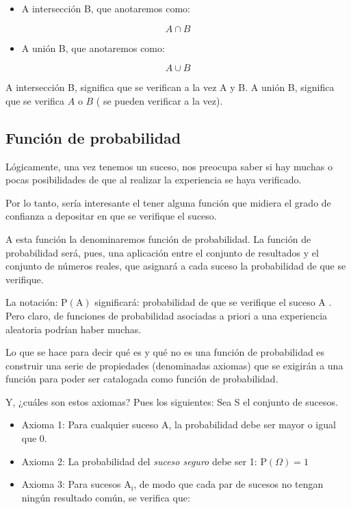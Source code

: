 \documentclass[
]{article}
\providecommand{\tightlist}{%
  \setlength{\itemsep}{0pt}\setlength{\parskip}{0pt}}
\begin{document}
\begin{itemize}
\tightlist
\item
  A intersección B, que anotaremos como:
\end{itemize}

\[
A \cap B
\]

\begin{itemize}
\tightlist
\item
  A unión B, que anotaremos como:
\end{itemize}

\[
A \cup B
\]

A intersección B, significa que se verifican a la vez A y B. A unión B,
significa que se verifica \(A\) o \(B\) ( se pueden verificar a la vez).

\subsection{Función de probabilidad}\label{funciuxf3n-de-probabilidad}

Lógicamente, una vez tenemos un suceso, nos preocupa saber si hay muchas
o pocas posibilidades de que al realizar la experiencia se haya
verificado.

Por lo tanto, sería interesante el tener alguna función que midiera el
grado de confianza a depositar en que se verifique el suceso.

A esta función la denominaremos función de probabilidad. La función de
probabilidad será, pues, una aplicación entre el conjunto de resultados
y el conjunto de números reales, que asignará a cada suceso la
probabilidad de que se verifique.

La notación: \(\mathrm{P}(\mathrm{A})\) significará: probabilidad de que
se verifique el suceso A . Pero claro, de funciones de probabilidad
asociadas a priori a una experiencia aleatoria podrían haber muchas.

Lo que se hace para decir qué es y qué no es una función de probabilidad
es construir una serie de propiedades (denominadas axiomas) que se
exigirán a una función para poder ser catalogada como función de
probabilidad.

Y, ¿cuáles son estos axiomas? Pues los siguientes: Sea S el conjunto de
sucesos.

\begin{itemize}
\item
  Axioma 1: Para cualquier suceso A, la probabilidad debe ser
  mayor o igual que 0.
\item
  Axioma 2: La probabilidad del \emph{suceso seguro} debe ser 1: \(\mathrm{P}(\Omega)=1\)
\item
  Axioma 3: Para sucesos \(\mathrm{A}_{\mathrm{i}}\), de modo que cada par de sucesos no
  tengan ningún resultado común, se verifica que:
\end{itemize}
\end{document}
